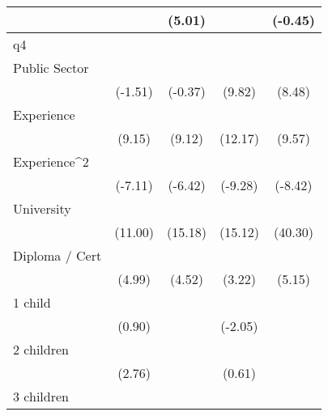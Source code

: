 {\begin{tabular}{l*{4}{c}}
                    &                     &      (5.01)         &                     &     (-0.45)         \\
\hline
q4                  &                     &                     &                     &                     \\
Public Sector       &                     &                     &            \sym{***}&            \sym{***}\\
                    &     (-1.51)         &     (-0.37)         &      (9.82)         &      (8.48)         \\
[1em]
Experience          &            \sym{***}&            \sym{***}&            \sym{***}&            \sym{***}\\
                    &      (9.15)         &      (9.12)         &     (12.17)         &      (9.57)         \\
[1em]
Experience^{2}      &            \sym{***}&            \sym{***}&            \sym{***}&            \sym{***}\\
                    &     (-7.11)         &     (-6.42)         &     (-9.28)         &     (-8.42)         \\
[1em]
University          &            \sym{***}&            \sym{***}&            \sym{***}&            \sym{***}\\
                    &     (11.00)         &     (15.18)         &     (15.12)         &     (40.30)         \\
[1em]
Diploma / Cert      &            \sym{***}&            \sym{***}&            \sym{**} &            \sym{***}\\
                    &      (4.99)         &      (4.52)         &      (3.22)         &      (5.15)         \\
[1em]
1 child             &                     &                     &            \sym{*}  &                     \\
                    &      (0.90)         &                     &     (-2.05)         &                     \\
[1em]
2 children          &            \sym{**} &                     &                     &                     \\
                    &      (2.76)         &                     &      (0.61)         &                     \\
[1em]
3 children          &            \sym{*}  &                     &                     &                     \\

\end{tabular}}
